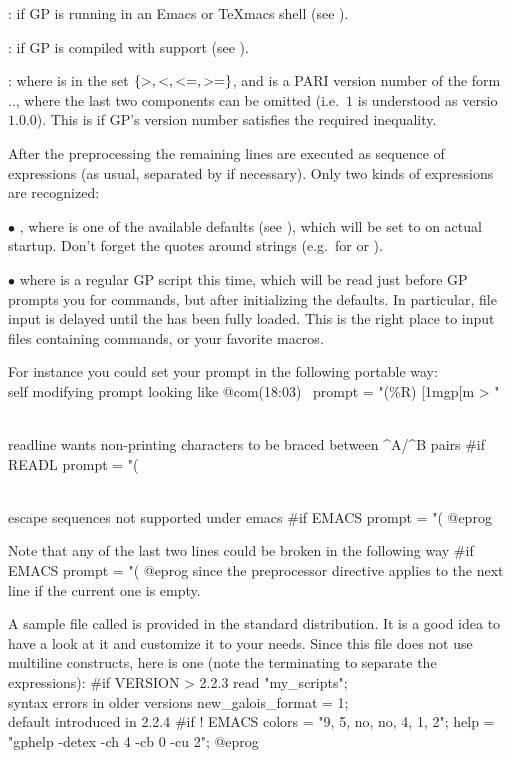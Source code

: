 :  if GP is running in an Emacs or TeXmacs shell (see
).

:  if GP is compiled with  support (see
).

  : where  is in the set
$\{ {\tt >}, {\tt <}, {\tt <=}, {\tt >=} \}$, and  is a PARI
version number of the form .., where the
last two components can be omitted (i.e.~$1$ is understood as versio $1.0.0$).
This is  if GP's version number satisfies the required
inequality.

After the preprocessing the remaining lines are executed as
sequence of expressions (as usual, separated by \kbd{;} if necessary). Only
two kinds of expressions are recognized:

$\bullet$  \kbd{=} , where  is one of
the available defaults (see ), which will be set to
 on actual startup. Don't forget the quotes around strings
(e.g.~for  or ).

$\bullet$  where 
is a regular GP script this time, which will be read just before GP prompts
you for commands, but after initializing the defaults. In particular, file
input is delayed until the  has been fully loaded. This is the
right place to input files containing  commands, or your favorite
macros.

\noindent For instance you could set your prompt in the following portable way:
\bprog
\\ self modifying prompt looking like @com\hbox{\rm(18:03) \kbd{ >}}
prompt   = "(\%R) \e[1mgp\e[m > "

\\ readline wants non-printing characters to be braced between ^A/^B pairs
#if READL prompt = "(%

\\ escape sequences not supported under emacs
#if EMACS prompt = "(%
@eprog

\noindent Note that any of the last two lines could be broken in the
following way
\bprog
#if EMACS
  prompt = "(%
@eprog
\noindent since the preprocessor directive applies to the next line if the
current one is empty.

A sample  file called  is provided in the
standard distribution. It is a good idea to have a look at it and customize
it to your needs. Since this file does not use multiline constructs, here is
one (note the terminating \kbd{;} to separate the expressions):
\bprog
#if VERSION > 2.2.3
{
  read "my_scripts";     \\ syntax errors in older versions
  new_galois_format = 1; \\ default introduced in 2.2.4
}
#if ! EMACS
{
  colors = "9, 5, no, no, 4, 1, 2";
  help   = "gphelp -detex -ch 4 -cb 0 -cu 2";
}
@eprog

